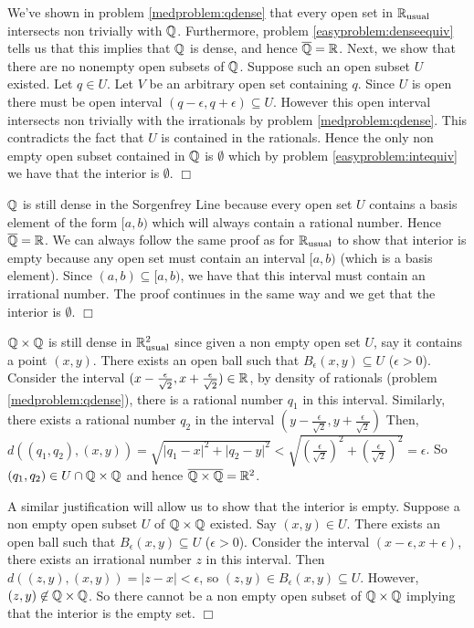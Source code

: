 \documentclass{article}
\begin{document}
{\begin{spacedenumerate}
    \item We've shown in problem \ref{medproblem:qdense} that every open set in $\mathbb{R}_{\text{usual}}$ intersects non trivially with $\mathbb{Q}$. Furthermore, problem \ref{easyproblem:denseequiv} tells us that this implies that $\mathbb{Q}$ is dense, and hence $\overline{\mathbb{Q}} = \mathbb{R}$. Next, we show that there are no nonempty open subsets of $\mathbb{Q}$. Suppose such an open subset $U$ existed. Let $q\in U$. Let $V$ be an arbitrary open set  containing $q$. Since $U$ is open there must be open interval $(q-\epsilon, q + \epsilon)\subseteq U$. However this open interval intersects non trivially with the irrationals by problem \ref{medproblem:qdense}. This contradicts the fact that $U$ is contained in the rationals. Hence the only non empty open subset contained in $\mathbb{Q}$ is $\emptyset$ which by problem \ref{easyproblem:intequiv} we have that the interior is $\emptyset$. $\Box$
    \item $\mathbb{Q}$ is still dense in the Sorgenfrey Line because every open set $U$ contains a basis element of the form $[a,b)$ which will always contain a rational number. Hence $\overline{\mathbb{Q}} = \mathbb{R}$. We can always follow the same proof as for $\mathbb{R}_{\text{usual}}$ to show that interior is empty because any open set must contain an interval $[a,b)$ (which is a basis element). Since $(a,b)\subseteq [a,b)$, we have that this interval must contain an irrational number. The proof continues in the same way and we get that the interior is $\emptyset$. $\Box$
    \item $\mathbb{Q}\times \mathbb{Q}$ is still dense in $\mathbb{R}_{\text{usual}}^{2}$ since given a non empty open set $U$, say it contains a point $(x,y)$. There exists an open ball such that $B_{\epsilon}(x,y)\subseteq U$ ($\epsilon > 0$). Consider the interval $(x-\frac{\epsilon}{\sqrt{2}}, x+\frac{\epsilon}{\sqrt{2}})\in \mathbb{R}$, by density of rationals (problem \ref{medproblem:qdense}), there is a rational number $q_{1}$ in this interval. Similarly, there exists a rational number $q_{2}$ in the interval $(y-\frac{\epsilon}{\sqrt{2}}, y + \frac{\epsilon}{\sqrt{2}})$  Then, $d((q_{1},q_{2}), (x,y)) = \sqrt{\lvert q_{1}- x\rvert^{2} + \lvert q_{2} - y\rvert^{2}} < \sqrt{\left(\frac{\epsilon}{\sqrt{2}}\right)^{2} + \left(\frac{\epsilon}{\sqrt{2}}\right)^{2}} = \epsilon$. So $(q_{1}, q_{2}) \in U\cap \mathbb{Q}\times \mathbb{Q}$ and hence $\overline{\mathbb{Q}\times \mathbb{Q}} = \mathbb{R}^{2}$.
    
    A similar justification will allow us to show that the interior is empty. Suppose a non empty open subset $U$ of $\mathbb{Q}\times \mathbb{Q}$ existed. Say $(x,y)\in U$. There exists an open ball such that $B_{\epsilon}(x,y)\subseteq U$ ($\epsilon > 0$). Consider the interval $(x-\epsilon, x + \epsilon)$, there exists an irrational number $z$ in this interval. Then $d((z,y),(x,y)) = \lvert z-x\rvert < \epsilon$, so $(z,y)\in B_{\epsilon}(x,y)\subseteq U$. However, $(z,y)\not\in \mathbb{Q}\times\mathbb{Q}$. So there cannot be a non empty open subset of $\mathbb{Q}\times \mathbb{Q}$ implying that the interior is the empty set.  $\Box$
\end{spacedenumerate}
}
\end{document}
